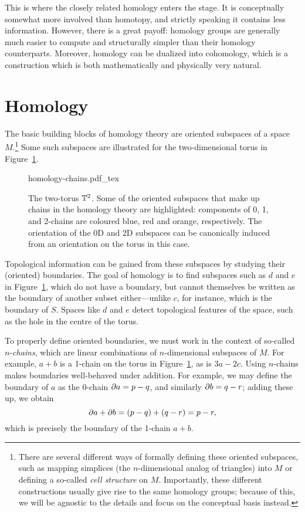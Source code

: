 This is where the closely related homology enters the stage. It is conceptually somewhat more involved than homotopy, and strictly speaking it contains less information. However, there is a great payoff: homology groups are generally much easier to compute and structurally simpler than their homology counterparts. Moreover, homology can be dualized into cohomology, which is a construction which is both mathematically and physically very natural.


\section*{Homology}

The basic building blocks of homology theory are oriented subspaces of a space $M$.\footnote{
	There are several different ways of formally defining these oriented subspaces, such as mapping simplices (the $n$-dimensional analog of triangles) into $M$ or defining a so-called \emph{cell structure} on $M$. Importantly, these different constructions usually give rise to the same homology groups; because of this, we will be agnostic to the details and focus on the conceptual basis instead.} %
Some such subspaces are illustrated for the two-dimensional torus in Figure~\ref{fig:homology-chains}.
\begin{figure}[htb!]
	\centering
	\def\svgwidth{.6\linewidth}
	{homology-chains.pdf_tex}
	\caption{The two-torus $\mathbb{T}^2$. Some of the oriented subspaces that make up chains in the homology theory are highlighted: components of 0, 1, and 2-chains are coloured blue, red and orange, respectively. The orientation of the 0D and 2D subspaces can be canonically induced from an orientation on the torus in this case.}
	\label{fig:homology-chains}
\end{figure}
Topological information can be gained from these subspaces by studying their (oriented) boundaries. The goal of homology is to find subspaces such as $d$ and $e$ in Figure~\ref{fig:homology-chains}, which do not have a boundary, but cannot themselves be written as the boundary of another subset either---unlike $c$, for instance, which is the boundary of $S$. Spaces like $d$ and $e$ detect topological features of the space, such as the hole in the centre of the torus.

To properly define oriented boundaries, we must work in the context of so-called $n$-\emph{chains}, which are linear combinations of $n$-dimensional subspaces of $M$. For example, $a+b$ is a 1-chain on the torus in Figure~\ref{fig:homology-chains}, as is $3a-2c$. Using $n$-chains makes boundaries well-behaved under addition. For example, we may define the boundary of $a$ as the 0-chain $\partial a = p - q$, and similarly $\partial b = q - r$; adding these up, we obtain
\begin{equation*}
	\partial a + \partial b = (p - q) + (q - r) = p - r,
\end{equation*}
which is precisely the boundary of the 1-chain $a+b$.

